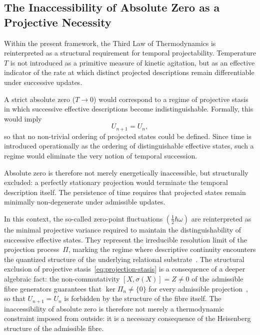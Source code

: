 \subsection{The Inaccessibility of Absolute Zero as a Projective Necessity}
  \label{subsec:absolute-zero-necessity}

  Within the present framework, the Third Law of Thermodynamics is
  reinterpreted as a structural requirement for temporal projectability.
  Temperature $T$ is not introduced as a primitive measure of kinetic
  agitation, but as an effective indicator of the rate at which distinct
  projected descriptions remain differentiable under successive updates.

  A strict absolute zero ($T \rightarrow 0$) would correspond to a regime of
  projective stasis in which successive effective descriptions become
  indistinguishable.
  Formally, this would imply
  \begin{equation}
    U_{n+1} = U_n ,\label{eq:projection-stasis}
  \end{equation}
  so that no non-trivial ordering of projected states could be defined.
  Since time is introduced operationally as the ordering of distinguishable
  effective states, such a regime would eliminate the very notion of
  temporal succession.

  Absolute zero is therefore not merely energetically inaccessible, but
  structurally excluded: a perfectly stationary projection would terminate
  the temporal description itself.
  The persistence of time requires that projected states remain minimally
  non-degenerate under admissible updates.

  In this context, the so-called zero-point fluctuations
  $(\tfrac{1}{2}\hbar\omega)$ are reinterpreted as the minimal projective
  variance required to maintain the distinguishability of successive
  effective states.
  They represent the irreducible resolution limit of the projection
  process~$\Pi$, marking the regime where descriptive continuity encounters
  the quantized structure of the underlying relational substrate~\cite{Beau2026a}.
  The structural exclusion of projective stasis~\eqref{eq:projection-stasis}
  is a consequence of a deeper algebraic fact: the non-commutativity
  $[X,\sigma(X)] = Z \neq 0$ of the admissible fibre generators guarantees
  that $\ker\Pi_n \neq \{0\}$ for every admissible projection~\cite{Beau2026m},
  so that $U_{n+1} = U_n$ is forbidden by the structure of the fibre itself.
  The inaccessibility of absolute zero is therefore not merely a thermodynamic
  constraint imposed from outside: it is a necessary consequence of the
  Heisenberg structure of the admissible fibre.
